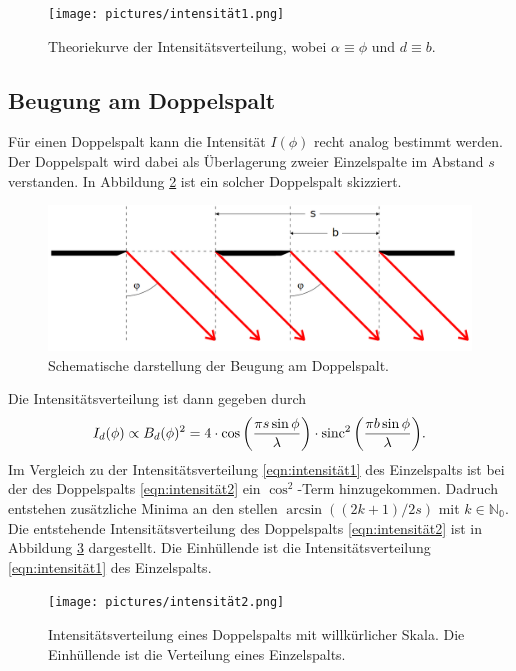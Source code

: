 \begin{figure}[H]
    \centering
    \texttt{[image: pictures/intensität1.png]}
    \caption{Theoriekurve der Intensitätsverteilung, wobei $\alpha\equiv\phi$ und $d\equiv b$. \cite{AP03}} %
    \label{fig:frauenhofer3}
\end{figure}

\subsection{Beugung am Doppelspalt}
\label{sec:doppel}
Für einen Doppelspalt kann die Intensität $I(\phi)$ recht analog bestimmt werden. Der Doppelspalt wird dabei als Überlagerung zweier Einzelspalte im
Abstand $s$ verstanden. In Abbildung \ref{fig:doppel} ist ein solcher Doppelspalt skizziert.
\begin{figure}[H]
    \centering
    \includegraphics[scale = 0.4]{pictures/doppel.png}
    \caption{Schematische darstellung der Beugung am Doppelspalt. \cite{AP01}}
    \label{fig:doppel}
\end{figure}

\noindent
Die Intensitätsverteilung ist dann gegeben durch
\begin{equation}
    I_d(\phi)\propto B_d(\phi)^2
    =4\cdot \cos{\left(\frac{\pi s\sin{\phi}}{\lambda}\right)}\cdot \operatorname{sinc}^2{\left(\frac{\pi b \sin{\phi}}{\lambda}\right)}  .
    \label{eqn:intensität2}
\end{equation}
Im Vergleich zu der Intensitätsverteilung \eqref{eqn:intensität1} des Einzelspalts ist bei der des Doppelspalts \eqref{eqn:intensität2} ein
$\cos^2$-Term hinzugekommen. Dadruch entstehen zusätzliche Minima an den stellen $\arcsin{((2k+1)/2s)}$ mit $k\in\mathbb{N_0}$. Die entstehende
Intensitätsverteilung des Doppelspalts \eqref{eqn:intensität2} ist in Abbildung \ref{fig:intensität2} dargestellt. Die Einhüllende ist die Intensitätsverteilung
\ref{eqn:intensität1} des Einzelspalts.
\begin{figure}[H]
    \centering
    \texttt{[image: pictures/intensität2.png]}
    \caption{Intensitätsverteilung eines Doppelspalts mit willkürlicher Skala. Die Einhüllende ist die Verteilung eines Einzelspalts. \cite{AP04}}
    \label{fig:intensität2}
\end{figure}

